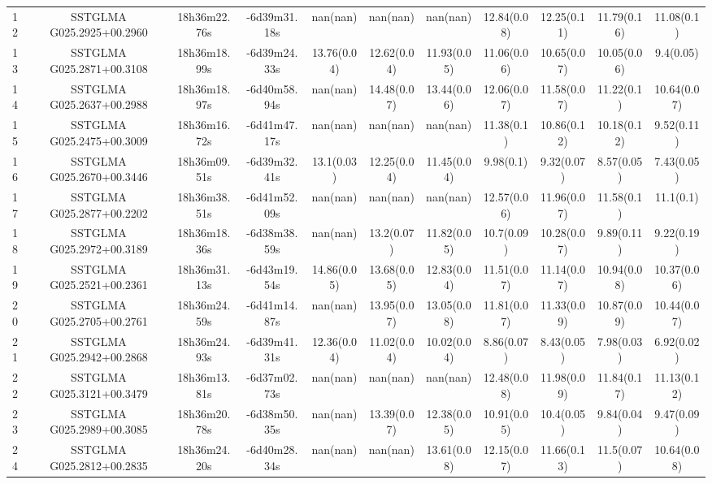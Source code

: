 \begin{table}
{\begin{tabular}[c]{lcccccccccc}
12 & SSTGLMA G025.2925+00.2960 & 18h36m22.76s & -6d39m31.18s & nan(nan)    & nan(nan)    & nan(nan)    & 12.84(0.08) & 12.25(0.11) & 11.79(0.16) & 11.08(0.1) \\
13 & SSTGLMA G025.2871+00.3108 & 18h36m18.99s & -6d39m24.33s & 13.76(0.04) & 12.62(0.04) & 11.93(0.05) & 11.06(0.06) & 10.65(0.07) & 10.05(0.06) & 9.4(0.05) \\
14 & SSTGLMA G025.2637+00.2988 & 18h36m18.97s & -6d40m58.94s & nan(nan)    & 14.48(0.07) & 13.44(0.06) & 12.06(0.07) & 11.58(0.07) & 11.22(0.1)  & 10.64(0.07) \\
15 & SSTGLMA G025.2475+00.3009 & 18h36m16.72s & -6d41m47.17s & nan(nan)    & nan(nan)    & nan(nan)    & 11.38(0.1)  & 10.86(0.12) & 10.18(0.12) & 9.52(0.11) \\
16 & SSTGLMA G025.2670+00.3446 & 18h36m09.51s & -6d39m32.41s & 13.1(0.03)  & 12.25(0.04) & 11.45(0.04) & 9.98(0.1)   & 9.32(0.07)  & 8.57(0.05)  & 7.43(0.05) \\
17 & SSTGLMA G025.2877+00.2202 & 18h36m38.51s & -6d41m52.09s & nan(nan)    & nan(nan)    & nan(nan)    & 12.57(0.06) & 11.96(0.07) & 11.58(0.1)  & 11.1(0.1) \\
18 & SSTGLMA G025.2972+00.3189 & 18h36m18.36s & -6d38m38.59s & nan(nan)    & 13.2(0.07)  & 11.82(0.05) & 10.7(0.09)  & 10.28(0.07) & 9.89(0.11)  & 9.22(0.19) \\
19 & SSTGLMA G025.2521+00.2361 & 18h36m31.13s & -6d43m19.54s & 14.86(0.05) & 13.68(0.05) & 12.83(0.04) & 11.51(0.07) & 11.14(0.07) & 10.94(0.08) & 10.37(0.06) \\
20 & SSTGLMA G025.2705+00.2761 & 18h36m24.59s & -6d41m14.87s & nan(nan)    & 13.95(0.07) & 13.05(0.08) & 11.81(0.07) & 11.33(0.09) & 10.87(0.09) & 10.44(0.07) \\
21 & SSTGLMA G025.2942+00.2868 & 18h36m24.93s & -6d39m41.31s & 12.36(0.04) & 11.02(0.04) & 10.02(0.04) & 8.86(0.07)  & 8.43(0.05)  & 7.98(0.03)  & 6.92(0.02) \\
22 & SSTGLMA G025.3121+00.3479 & 18h36m13.81s & -6d37m02.73s & nan(nan)    & nan(nan)    & nan(nan)    & 12.48(0.08) & 11.98(0.09) & 11.84(0.17) & 11.13(0.12) \\
23 & SSTGLMA G025.2989+00.3085 & 18h36m20.78s & -6d38m50.35s & nan(nan)    & 13.39(0.07) & 12.38(0.05) & 10.91(0.05) & 10.4(0.05)  & 9.84(0.04)  & 9.47(0.09) \\
24 & SSTGLMA G025.2812+00.2835 & 18h36m24.20s & -6d40m28.34s & nan(nan)    & nan(nan)    & 13.61(0.08) & 12.15(0.07) & 11.66(0.13) & 11.5(0.07)  & 10.64(0.08) \\

\end{tabular}}
\end{table}
